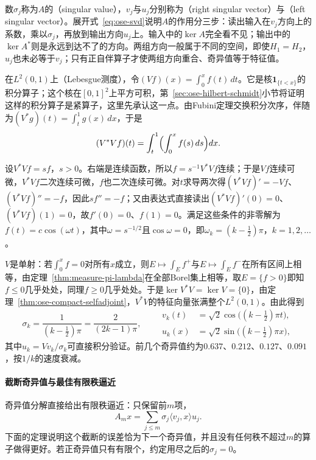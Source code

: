 数$\sigma_j$称为$A$的（singular value），$v_j$与$u_j$分别称为（right singular vector）与（left singular vector）。展开式~\eqref{eq:ose-svd}说明$A$的作用分三步：读出输入在$v_j$方向上的系数，乘以$\sigma_j$，再放到输出方向$u_j$上。输入中的$\ker A$完全看不见；输出中的$\ker A^*$则是永远到达不了的方向。两组方向一般属于不同的空间，即使$H_1=H_2$，$u_j$也未必等于$v_j$；只有正自伴算子才使两组方向重合、奇异值等于特征值。

\begin{example}[积分算子的奇异值分解]
\label{ex:ose-volterra-svd}
在$L^2(0,1)$上（Lebesgue测度），令$(Vf)(x)=\int_0^xf(t)\,dt$。它是核$\mathbf 1_{\{t<x\}}$的积分算子；这个核在$[0,1]^2$上平方可积，第~\ref{sec:ose-hilbert-schmidt}小节将证明这样的积分算子是紧算子，这里先承认这一点。由Fubini定理交换积分次序，伴随为$(V^*g)(t)=\int_t^1g(x)\,dx$，于是
\[
  (V^*Vf)(t)=\int_t^1\Bigl(\int_0^xf(s)\,ds\Bigr)dx .
\]

设$V^*Vf=sf$，$s>0$。右端是连续函数，所以$f=s^{-1}V^*Vf$连续；于是$Vf$连续可微，$V^*Vf$二次连续可微，$f$也二次连续可微。对$t$求导两次得$(V^*Vf)'=-Vf$、$(V^*Vf)''=-f$，因此$sf''=-f$；又由表达式直接读出$(V^*Vf)'(0)=0$、$(V^*Vf)(1)=0$，故$f'(0)=0$、$f(1)=0$。满足这些条件的非零解为$f(t)=c\cos(\omega t)$，其中$\omega=s^{-1/2}$且$\cos\omega=0$，即$\omega_k=(k-\tfrac12)\pi$，$k=1,2,\ldots$。

$V$是单射：若$\int_0^xf=0$对所有$x$成立，则$E\mapsto\int_Ef^+$与$E\mapsto\int_Ef^-$在所有区间上相等，由定理~\ref{thm:measure-pi-lambda}在全部Borel集上相等，取$E=\{f>0\}$即知$f\leq0$几乎处处，同理$f\geq0$几乎处处。于是$\ker V^*V=\ker V=\{0\}$，由定理~\ref{thm:ose-compact-selfadjoint}，$V^*V$的特征向量张满整个$L^2(0,1)$。由此得到
\[
  \sigma_k=\frac{1}{(k-\frac12)\pi}=\frac{2}{(2k-1)\pi},\qquad
  \begin{aligned}
    v_k(t)&=\sqrt2\cos\bigl((k-\tfrac12)\pi t\bigr),\\
    u_k(x)&=\sqrt2\sin\bigl((k-\tfrac12)\pi x\bigr),
  \end{aligned}
\]
其中$u_k=Vv_k/\sigma_k$可直接积分验证。前几个奇异值约为$0.637$、$0.212$、$0.127$、$0.091$，按$1/k$的速度衰减。
\end{example}

\paragraph{截断奇异值与最佳有限秩逼近}
奇异值分解直接给出有限秩逼近：只保留前$m$项，
\[
  A_mx=\sum_{j\leq m}\sigma_j\langle v_j,x\rangle u_j .
\]
下面的定理说明这个截断的误差恰为下一个奇异值，并且没有任何秩不超过$m$的算子做得更好。若正奇异值只有有限个，约定用尽之后的$\sigma_j=0$。


